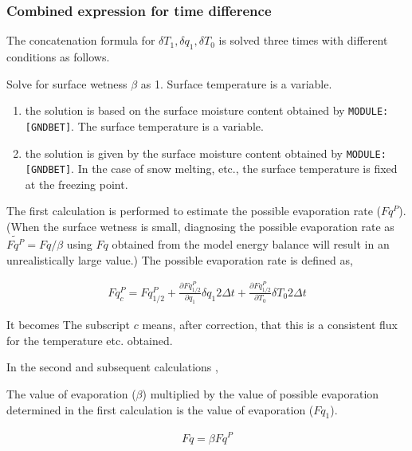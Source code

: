 \hypertarget{combined-expression-for-time-difference}{%
\subsubsection{Combined expression for time
difference}\label{combined-expression-for-time-difference}}

The concatenation formula for \(\delta T_1, \delta q_1, \delta T_0\) is
solved three times with different conditions as follows.

Solve for surface wetness \(\beta\) as 1. Surface temperature is a
variable.

\begin{enumerate}
\def\labelenumi{\arabic{enumi}.}
\setcounter{enumi}{1}
\item
  the solution is based on the surface moisture content obtained by
  \texttt{MODULE:{[}GNDBET{]}}. The surface temperature is a variable.
\item
  the solution is given by the surface moisture content obtained by
  \texttt{MODULE:{[}GNDBET{]}}. In the case of snow melting, etc., the
  surface temperature is fixed at the freezing point.
\end{enumerate}

The first calculation is performed to estimate the possible evaporation
rate (\(Fq^P\)). (When the surface wetness is small, diagnosing the
possible evaporation rate as \(\widetilde{Fq^P} = Fq / \beta\) using
\(Fq\) obtained from the model energy balance will result in an
unrealistically large value.) The possible evaporation rate is defined
as,

\begin{eqnarray}
  Fq^P_c = Fq^P_{1/2}
       + \frac{\partial{Fq^P_{1/2}}}{\partial {q_1}} \delta q_1 2 \Delta t
       + \frac{\partial{Fq^P_{1/2}}}{\partial {T_0}} \delta T_0 2 \Delta t
\end{eqnarray}

It becomes The subscript \(c\) means, after correction, that this is a
consistent flux for the temperature etc. obtained.

In the second and subsequent calculations ,

The value of evaporation (\(\beta\)) multiplied by the value of possible
evaporation determined in the first calculation is the value of
evaporation (\(Fq_1\)).

\begin{eqnarray}
        Fq = \beta Fq^P
\end{eqnarray}

